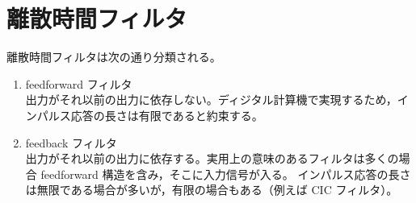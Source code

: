 \chapter{離散時間フィルタ}
    離散時間フィルタは次の通り分類される。
    \begin{enumerate}
        \item feedforward フィルタ\\
        出力がそれ以前の出力に依存しない。ディジタル計算機で実現するため，インパルス応答の長さは有限であると約束する。
        \item feedback フィルタ\\
        出力がそれ以前の出力に依存する。実用上の意味のあるフィルタは多くの場合 feedforward 構造を含み，そこに入力信号が入る。
        インパルス応答の長さは無限である場合が多いが，有限の場合もある（例えば CIC フィルタ）。
    \end{enumerate}
    
    
    
    
